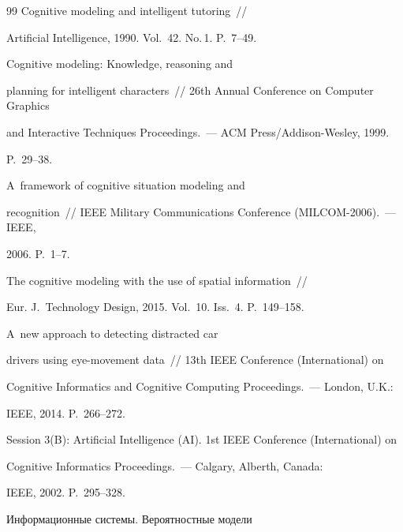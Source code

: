 {{\begin{thebibliography}{99}
Cognitive modeling and intelligent tutoring~/\!\!/ 


Artificial Intelligence, 1990. Vol.~42. No.\,1. P.~7--49.







 Cognitive modeling: Knowledge, reasoning and 


planning for intelligent characters~/\!\!/ 26th Annual Conference on Computer Graphics 


and Interactive Techniques Proceedings.~--- ACM Press/Addison-Wesley, 1999.  


P.~29--38.







 A~framework of cognitive situation modeling and 


recognition~/\!\!/ IEEE Military Communications Conference (MILCOM-2006).~--- IEEE, 


2006. P.~1--7.







 The cognitive modeling with the use of spatial information~/\!\!/ 


Eur. J.~Technology Design, 2015. Vol.~10. Iss.~4. P.~149--158.




 A~new approach to detecting distracted car 


drivers using eye-movement data~/\!\!/ 13th IEEE  Conference (International) on 


Cognitive Informatics and Cognitive Computing Proceedings.~--- London, U.K.:


IEEE, 2014. P.~266--272.




Session 3(B): Artificial Intelligence (AI). 1st IEEE Conference (International) on 


Cognitive Informatics Proceedings.~--- Calgary, Alberth, Canada:


IEEE, 2002. P.~295--328.




 Информационные системы. Вероятностные модели 



\end{thebibliography}}}
